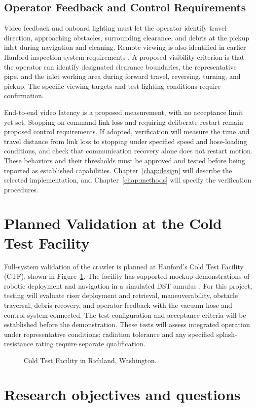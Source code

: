 \subsection{Operator Feedback and Control Requirements}
\label{sec:operator-requirements}
Video feedback and onboard lighting must let the operator identify travel direction, approaching obstacles, surrounding clearance, and debris at the pickup inlet during navigation and cleaning. Remote viewing is also identified in earlier Hanford inspection-system requirements \citep{pardini2001DSTRequirements}. A proposed visibility criterion is that the operator can identify designated clearance boundaries, the representative pipe, and the inlet working area during forward travel, reversing, turning, and pickup. The specific viewing targets and test lighting conditions require confirmation.

End-to-end video latency is a proposed measurement, with no acceptance limit yet set. Stopping on command-link loss and requiring deliberate restart remain proposed control requirements. If adopted, verification will measure the time and travel distance from link loss to stopping under specified speed and hose-loading conditions, and check that communication recovery alone does not restart motion. These behaviors and their thresholds must be approved and tested before being reported as established capabilities. Chapter~\ref{chap:design} will describe the selected implementation, and Chapter~\ref{chap:methods} will specify the verification procedures.
\par
\endgroup

\section{Planned Validation at the Cold Test Facility}
\label{sec:ctf-validation}
\begingroup
\setlength{\emergencystretch}{2em}

Full-system validation of the crawler is planned at Hanford's Cold Test Facility (CTF), shown in Figure~\ref{fig:ctf}. The facility has supported mockup demonstrations of robotic deployment and navigation in a simulated DST annulus \citep{doe2024CTFDemonstration}. For this project, testing will evaluate riser deployment and retrieval, maneuverability, obstacle traversal, debris recovery, and operator feedback with the vacuum hose and control system connected. The test configuration and acceptance criteria will be established before the demonstration. These tests will assess integrated operation under representative conditions; radiation tolerance and any specified splash-resistance rating require separate qualification.

\begin{figure}[H]
\centering
{}
\caption{Cold Test Facility in Richland, Washington.}
\label{fig:ctf}
\end{figure}
\par
\endgroup


\section{Research objectives and questions}
\label{sec:research-objectives}
\begingroup
\setlength{\emergencystretch}{2em}
\endgroup
